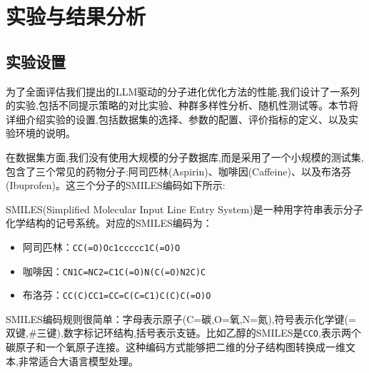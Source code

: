 \chapter{实验与结果分析}
\vspace{7pt}


\section{实验设置}

为了全面评估我们提出的LLM驱动的分子进化优化方法的性能,我们设计了一系列的实验,包括不同提示策略的对比实验、种群多样性分析、随机性测试等。本节将详细介绍实验的设置,包括数据集的选择、参数的配置、评价指标的定义、以及实验环境的说明。

在数据集方面,我们没有使用大规模的分子数据库,而是采用了一个小规模的测试集,包含了三个常见的药物分子:阿司匹林(Aspirin)、咖啡因(Caffeine)、以及布洛芬(Ibuprofen)。这三个分子的SMILES编码如下所示:


SMILES(Simplified Molecular Input Line Entry System)是一种用字符串表示分子化学结构的记号系统。对应的SMILES编码为：
\begin{itemize}
\item 阿司匹林：\texttt{CC(=O)Oc1ccccc1C(=O)O}
\item 咖啡因：\texttt{CN1C=NC2=C1C(=O)N(C(=O)N2C)C}
\item 布洛芬：\texttt{CC(C)CC1=CC=C(C=C1)C(C)C(=O)O}
\end{itemize}

SMILES编码规则很简单：字母表示原子(C=碳,O=氧,N=氮),符号表示化学键(=双键,\#三键),数字标记环结构,括号表示支链。比如乙醇的SMILES是\texttt{CCO},表示两个碳原子和一个氧原子连接。这种编码方式能够把二维的分子结构图转换成一维文本,非常适合大语言模型处理。

